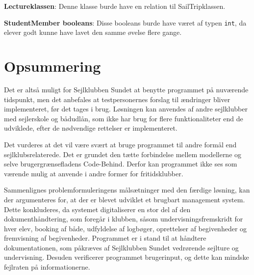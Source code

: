 \textbf{Lectureklassen}: 
Denne klasse burde have en relation til SailTripklassen. 

\textbf{StudentMember booleans}:
Disse booleans burde have været af typen \texttt{int}, da elever godt kunne have lavet den samme øvelse flere gange. 

\section*{Opsummering}

Det er altså muligt for Sejlklubben Sundet at benytte programmet på nuværende tidspunkt, men det anbefales at testpersonernes forslag til ændringer bliver implementeret, før det tages i brug.
Løsningen kan anvendes af andre sejlklubber med sejlerskole og bådudlån, som ikke har brug for flere funktionaliteter end de udviklede, efter de nødvendige rettelser er implementeret. 

Det vurderes at det vil være svært at bruge programmet til andre formål end sejlklubsrelaterede. 
Det er grundet den tætte forbindelse mellem modellerne og selve brugergrænsefladens Code-Behind. 
Derfor kan programmet ikke ses som værende mulig at anvende i andre former for fritidsklubber. 

Sammenlignes problemformuleringens målsætninger med den færdige løsning, kan der argumenteres for, at der er blevet udviklet et brugbart management system. 
Dette konkluderes, da systemet digitaliserer en stor del af den dokumenthåndtering, som foregår i klubben, såsom undervisningsfremskridt for hver elev, booking af både, udfyldelse af logbøger, oprettelser af begivenheder og fremvisning af begivenheder.
Programmet er i stand til at håndtere dokumentationen, som påkræves af Sejlklubben Sundet vedrørende sejlture og undervisning.
Desuden verificerer programmet brugerinput, og dette kan mindske fejlraten på informationerne.